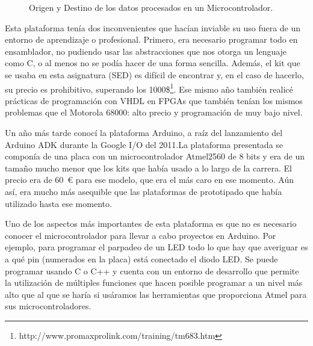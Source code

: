 \begin{figure}[H]
\begin{center}
\end{center}
\caption{Origen y Destino de los datos procesados en un Microcontrolador.}
\label{io_uc}
\end{figure}
Esta plataforma tenía dos inconvenientes que hacían inviable su uso fuera de un entorno de aprendizaje o profesional.  Primero, era necesario programar todo en ensamblador, no pudiendo usar las abstracciones que nos otorga un lenguaje como C, o al menos no se podía hacer de una forma sencilla.  Además, el kit que se usaba en esta asignatura (SED) es difícil de encontrar y, en el caso de hacerlo, su precio es prohibitivo, superando los 1000\$\footnote{http://www.promaxprolink.com/training/tm683.htm}.  Ese mismo año también realicé prácticas de programación con VHDL en FPGAs que también tenían los mismos problemas que el Motorola 68000: alto precio y programación de muy bajo nivel.

Un año más tarde conocí la plataforma Arduino, a raíz del lanzamiento del Arduino ADK durante la Google I/O del 2011.\@ La plataforma presentada se componía de una placa con un microcontrolador Atmel2560 de 8 bits y era de un tamaño mucho menor que los kits que había usado a lo largo de la carrera.  El precio era de 60~\euro{} para ese modelo, que era el más caro en ese momento. Aún así, era mucho más asequible que las plataformas de prototipado que había utilizado hasta ese momento.  

Uno de los aspectos más importantes de esta plataforma es que no es necesario conocer el microcontrolador para llevar a cabo proyectos en Arduino.  Por ejemplo, para programar el parpadeo de un LED todo lo que hay que averiguar es a qué pin (numerados en la placa) está conectado el diodo LED. Se puede programar usando C o C++ y cuenta con un entorno de desarrollo que permite la utilización de múltiples funciones que hacen posible programar a un nivel más alto que al que se haría si usáramos las herramientas que proporciona Atmel para sus microcontroladores.  

